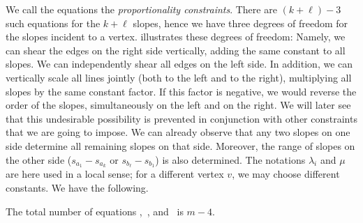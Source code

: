 We call the equations
\thetag{\ref{eq:proportion}--\ref{eq:proportion2}} the
\emph{proportionality constraints}.
There are $(k+\ell)-3$ such equations for the $k+\ell$ slopes, hence
we have three degrees of freedom for the slopes incident to a vertex.
 illustrates these  degrees of freedom:
Namely, we can shear the edges on the right side vertically, adding the same constant to all
slopes. We can independently shear all edges on the left side.
In addition, we can vertically scale {all} lines jointly (both to
the left and to the right), multiplying all slopes by the same constant factor.
If this factor is negative, we would reverse the order of the
slopes, simultaneously on the left and on the right. We will later see
that this undesirable possibility is prevented in conjunction with
other constraints that we are going to impose. We can already observe
that any two slopes on one side determine all remaining slopes on that side. Moreover, the range of slopes on the other side ($s_{a_1}-s_{a_{k}}$ or $s_{b_{\ell}}-s_{b_1}$) is also determined.
%
The notations $\lambda_i$ and $\mu$ are here used in a local sense;
for a different vertex $v$, we may choose different constants.
We have the following.
\begin{lem} \label{le:number-of-equations}
The total number of equations \thetag{\ref{eq:slope0}},~\thetag{\ref{eq:proportion}}, and~\thetag{\ref{eq:proportion2}} is $m-4$.
\end{lem} 
